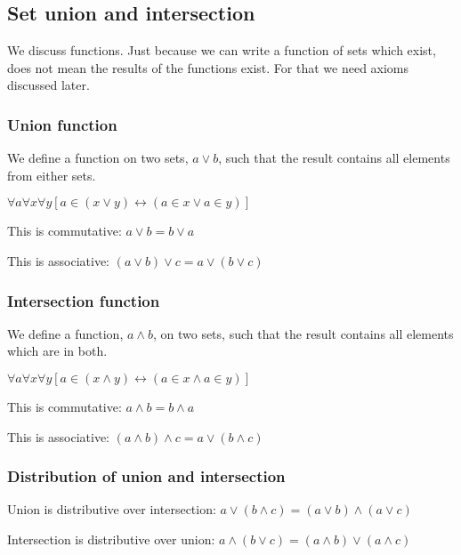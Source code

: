 
\subsection{Set union and intersection}

We discuss functions. Just because we can write a function of sets which exist, does not mean the results of the functions exist. For that we need axioms discussed later.

\subsubsection{Union function}

We define a function on two sets, \(a\lor b\), such that the result contains all elements from either sets.

\(\forall a \forall x \forall y [a\in (x\lor y) \leftrightarrow (a\in x \lor a\in y)]\)

This is commutative: \(a\lor b = b\lor a\)

This is associative: \((a\lor b)\lor c = a\lor (b\lor c)\)

\subsubsection{Intersection function}

We define a function, \(a\land b\), on two sets, such that the result contains all elements which are in both.

\(\forall a \forall x \forall y [a\in (x\land y) \leftrightarrow (a\in x \land a\in y)]\)

This is commutative: \(a\land b = b\land a\)

This is associative: \((a\land b)\land c = a\lor (b\land c)\)

\subsubsection{Distribution of union and intersection}

Union is distributive over intersection: \(a\lor (b\land c)=(a\lor b)\land (a\lor c)\)

Intersection is distributive over union: \(a\land (b\lor c)=(a\land b)\lor (a\land c)\)

